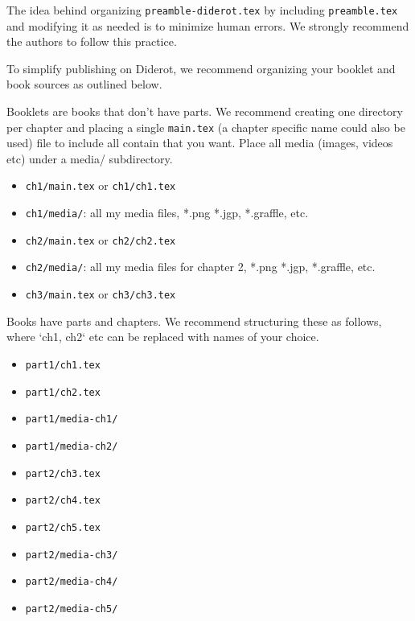 \begin{important}
The idea behind organizing \lstinline`preamble-diderot.tex` by including \lstinline`preamble.tex` and modifying it as needed is to minimize human errors.
%
We strongly recommend the authors to follow this practice.
\end{important}


To simplify publishing on Diderot, we recommend organizing your booklet and book sources as outlined below. 

\begin{gram}[Booklets]
Booklets are books that don't have parts. We recommend creating one directory per chapter and placing a single \lstinline`main.tex` (a chapter specific name could also be used) file to include all contain that you want.  
%
Place all media (images, videos etc) under a media/ subdirectory. 
\begin{itemize}  
\item \lstinline`ch1/main.tex` or \lstinline`ch1/ch1.tex`
\item \lstinline`ch1/media/`: all my media files, *.png *.jgp, *.graffle, etc.
\item \lstinline`ch2/main.tex` or \lstinline`ch2/ch2.tex`
\item \lstinline`ch2/media/`: all my media files for chapter 2, *.png *.jgp, *.graffle, etc.
\item \lstinline`ch3/main.tex` or \lstinline`ch3/ch3.tex`
\end{itemize}
\end{gram}

\begin{gram}[Books]
Books have parts and chapters. We recommend structuring these as follows, where `ch1, ch2` etc can be replaced with names of your choice.
%
\begin{itemize}
\item \lstinline`part1/ch1.tex`
\item \lstinline`part1/ch2.tex`
\item \lstinline`part1/media-ch1/`
\item \lstinline`part1/media-ch2/`
\item \lstinline`part2/ch3.tex`
\item \lstinline`part2/ch4.tex`
\item \lstinline`part2/ch5.tex`
\item \lstinline`part2/media-ch3/`
\item \lstinline`part2/media-ch4/`
\item \lstinline`part2/media-ch5/`
\end{itemize}
   
\end{gram}


